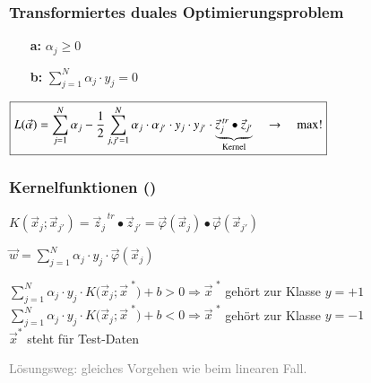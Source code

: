 \subsubsection{Transformiertes duales Optimierungsproblem}
    \begin{itemize}
        \item [\textbf{a:}] $\boxed{\alpha_j\geq0}$
        \item [\textbf{b:}] $\boxed{\sum_{j=1}^N\alpha_j \cdot y_j=0}$
    \end{itemize}
$\boxed{L(\vec{\alpha})=\sum_{j=1}^N\alpha_j-\frac{1}{2}\sum_{j,j'=1}^N\alpha_j \cdot \alpha_{j'} \cdot \space y_j \cdot y_{j'} \cdot \space \underbrace{\vec{z}_j^{\text{ $tr$}} \bullet  \vec{z}_{j'}}_{\text{Kernel}} \quad\to\quad\max!}$

\subsubsection{Kernelfunktionen ()}
$\boxed{K\left( \vec{x}_j ; \vec{x}_{j'}\right) = \vec{z}_j^{\text{ $tr$}}\bullet\vec{z}_{j'}=\vec{\varphi}(\vec{x}_j) \bullet \vec{\varphi}(\vec{x}_{j'})}$

$\boxed{\vec{w}=\sum_{j=1}^N\alpha_j \cdot y_j \cdot \vec{\varphi}(\vec{x}_j)}$

$\boxed{\sum_{j=1}^N\alpha_j \cdot y_j \cdot K\Big(\vec{x}_j;\vec{x}^{\text{ *}} \Big)+b>0\Longrightarrow\vec{x}^{\text{ *}}}$ gehört zur Klasse $y = +1$\\
$\boxed{\sum_{j=1}^N\alpha_j \cdot y_j \cdot K\Big(\vec{x}_j;\vec{x}^{\text{ *}} \Big)+b<0\Longrightarrow\vec{x}^{\text{ *}}}$ gehört zur Klasse $y = -1$\\
$\vec{x}^*$ steht für Test-Daten

\medskip
\textcolor{gray}{Lösungsweg: gleiches Vorgehen wie beim linearen Fall.}

